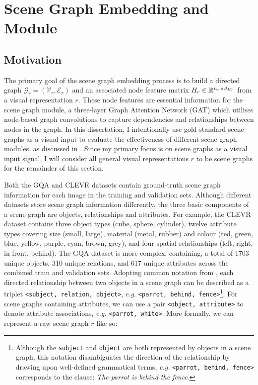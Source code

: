 \section{Scene Graph Embedding and Module}
\label{section:scene_graph_embedding}

\subsection{Motivation}
\label{section:scene_graph_embedding_motivation}

The primary goal of the scene graph embedding process is to build a directed graph \(\mathcal{G}_r = (\mathcal{V}_r, \mathcal{E}_r)\) and an associated node feature matrix \(H_r \in \mathbb{R}^{n_r \times d_{H_r}}\) from a visual representation \(r\). These node features are essential information for the scene graph module, a three-layer Graph Attention Network (GAT) \cite{velivckovic2017graph} which utilises node-based graph convolutions to capture dependencies and relationships between nodes in the graph. In this dissertation, I intentionally use gold-standard scene graphs as a visual input to evaluate the effectiveness of different scene graph modules, as discussed in \sectionautorefname{ \ref{sec:ablation_studies}}. Since my primary focus is on scene graphs as a visual input signal, I will consider all general visual representations \(r\) to be scene graphs for the remainder of this section.

Both the GQA and CLEVR datasets contain ground-truth scene graph information for each image in the training and validation sets. Although different datasets store scene graph information differently, the three basic components of a scene graph are objects, relationships and attributes. For example, the CLEVR dataset contains three object types (cube, sphere, cylinder), twelve attribute types covering size (small, large), material (metal, rubber) and colour (red, green, blue, yellow, purple, cyan, brown, grey), and four spatial relationships (left, right, in front, behind). The GQA dataset is more complex, containing, a total of 1703 unique objects, 310 unique relations, and 617 unique attributes across the combined train and validation sets. Adopting common notation from \cite{hudson2019gqa, li2019relation, yang2018graph}, each directed relationship between two objects in a scene graph can be described as a triplet \texttt{<subject, relation, object>}, \textit{e.g.} \texttt{<parrot, behind, fence>}\footnote{Although the \texttt{subject} and \texttt{object} are both represented by objects in a scene graph, this notation disambiguates the direction of the relationship by drawing upon well-defined grammatical terms, \textit{e.g.} \texttt{<parrot, behind, fence>} corresponds to the clause: \textit{The parrot is behind the fence}.}. For scene graphs containing attributes, we can use a pair \texttt{<object, attribute>} to denote attribute associations, \textit{e.g.} \texttt{<parrot, white>}. More formally, we can represent a raw scene graph 
\(r\) like so:

